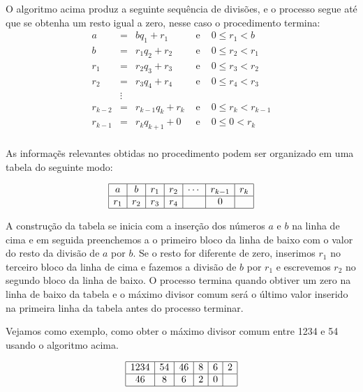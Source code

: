 O algoritmo acima produz a seguinte sequ\^{e}ncia de divis\~{o}es, e o processo segue at\'{e}
que se obtenha um resto igual a zero, nesse caso o procedimento termina:
\[
\begin{array}{rclcl}
a   		& =      & bq_{1}+r_{1} 			    & \textrm{ e } & 0\leq r_{1}<b       \\
b   		& =      & r_{1}q_{2}+r_{2} 	    & \textrm{ e } & 0\leq r_{2}<r_{1}       \\
r_{1}		& =      & r_{2}q_{3}+r_{3} 	    & \textrm{ e } & 0\leq r_{3}<r_{2}       \\
r_{2}   & =      & r_{3}q_{4}+r_{4} 	    & \textrm{ e } & 0\leq r_{4}<r_{3}       \\
        & \vdots &     		          	    &              &                     \\
r_{k-2} & =      & r_{k-1}q_{k}+r_{k}     & \textrm{ e } & 0\leq r_{k}<r_{k-1} \\				
r_{k-1} & =      & r_{k}q_{k+1}+ 0        & \textrm{ e } & 0\leq 0    <r_{k} \\		
\end{array}
\]  

As informa\c{c}\~{e}s relevantes obtidas no procedimento podem ser organizado em uma tabela do seguinte modo:

\[
\begin{array}{|c|c|c|c|c|c|c|}\hline
	a     & b     & r_{1} & r_{2} & \cdots & r_{k-1} & r_{k}\\ \hline
	r_{1}	& r_{2} & r_{3} & r_{4} &        & 0       &  \\ \hline
\end{array}
\]

A constru\c{c}\~{a}o da tabela se inicia com a inser\c{c}\~{a}o dos n\'{u}meros $a$ e $b$ na linha de cima e em seguida preenchemos
a o primeiro bloco da linha de baixo com o valor do resto da divis\~{a}o de $a$ por $b$. Se o resto for diferente de zero, 
inserimos $r_{1}$ no terceiro bloco da linha de cima e fazemos a divis\~{a}o de $b$ por $r_{1}$ e escrevemos
$r_{2}$ no segundo bloco da linha de baixo.
O processo termina quando obtiver um zero na linha de baixo da tabela e o m\'{a}ximo divisor comum ser\'{a} o 
\'{u}ltimo valor inserido na primeira linha da tabela antes do processo terminar. 

Vejamos como exemplo, como obter o m\'{a}ximo divisor comum entre 1234 e 54 usando o algoritmo acima. 

\[
\begin{array}{|c|c|c|c|c|c|}\hline
	1234 & 54 & 46 & 8 & 6 & 2 \\ \hline
	46   & 8  & 6  & 2 & 0 &   \\ \hline
\end{array}
\]

